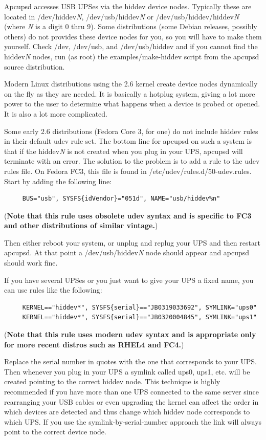 Apcupsd accesses USB UPSes via the hiddev device nodes. Typically these are
located in /dev/hiddev{\it N}, /dev/usb/hiddev{\it N} or
/dev/usb/hiddev/hiddev{\it N} (where {\it N} is a digit 0 thru 9). Some 
distributions (some Debian releases, possibly others) do not provides these
device nodes for you, so you will have to make them yourself. Check /dev, 
/dev/usb, and /dev/usb/hiddev and if you  cannot find the hiddev{\it N} nodes,
run (as root) the examples/make-hiddev script from the apcupsd source distribution.

Modern Linux distributions using the 2.6 kernel create device nodes dynamically
on the fly as they are needed. It is basically a hotplug system, giving a lot
more power to the user to determine what happens when a device is probed or 
opened. It is also a lot more complicated.  

Some early 2.6 distributions (Fedora Core 3, for one) do not include hiddev
rules in their default udev rule set. The bottom line for apcupsd on such a 
system is that if the hiddev{\it N} is not created when you plug in your UPS,
apcupsd will terminate with an error. The solution to the problem is to add 
a rule to the udev rules file. On Fedora FC3, this file is found in 
/etc/udev/rules.d/50-udev.rules. Start by adding the following line:

\begin{verbatim}
     BUS="usb", SYSFS{idVendor}="051d", NAME="usb/hiddev%n"
\end{verbatim}

({\bf Note that this rule uses obsolete udev syntax and is specific to FC3
and other distributions of similar vintage.})

Then either reboot your system, or unplug and replug your UPS and then restart
apcupsd. At that point a /dev/usb/hiddev{\it N} node should appear and apcupsd
should work fine.

If you have several UPSes or you just want to give your UPS a fixed name, you
can use rules like the following: 

\begin{verbatim}
     KERNEL=="hiddev*", SYSFS{serial}=="JB0319033692", SYMLINK="ups0"
     KERNEL=="hiddev*", SYSFS{serial}=="JB0320004845", SYMLINK="ups1"
\end{verbatim}

({\bf Note that this rule uses modern udev syntax and is appropriate
only for more recent distros such as RHEL4 and FC4.})

Replace the serial number in quotes with the one that corresponds to
your UPS. Then whenever you plug in your UPS a symlink called ups0, ups1, etc.
will be created pointing to the correct hiddev node. This technique is highly
recommended if you have more than one UPS connected to the same server since
rearranging your USB cables or even upgrading the kernel can affect the order
in which devices are detected and thus change which hiddev node corresponds
to which UPS. If you use the symlink-by-serial-number approach the link
will always point to the correct device node.

